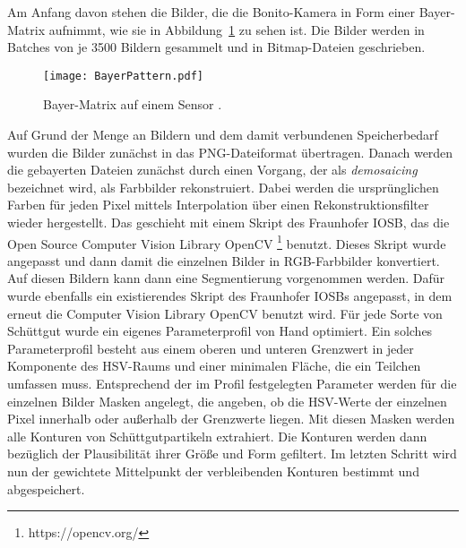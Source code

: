 Am Anfang davon stehen die Bilder, die die Bonito-Kamera in Form einer Bayer-Matrix aufnimmt, wie sie in Abbildung~\ref{fig:bayerPattern} zu sehen ist.
Die Bilder werden in Batches von je 3500 Bildern gesammelt und in Bitmap-Dateien geschrieben.
\begin{figure}[h]
	\centering
	\texttt{[image: BayerPattern.pdf]}
	\caption{Bayer-Matrix auf einem Sensor \cite{bayerPattern06}.}
	\label{fig:bayerPattern}
\end{figure}
Auf Grund der Menge an Bildern und dem damit verbundenen Speicherbedarf wurden die Bilder zunächst in das PNG-Dateiformat übertragen.
Danach werden die gebayerten Dateien zunächst durch einen Vorgang, der als \textit{demosaicing} bezeichnet wird,
als Farbbilder rekonstruiert.
Dabei werden die ursprünglichen Farben für jeden Pixel mittels Interpolation über einen Rekonstruktionsfilter wieder hergestellt.
Das geschieht mit einem Skript des Fraunhofer IOSB, das die Open Source Computer Vision Library OpenCV \footnote{https://opencv.org/} benutzt.
Dieses Skript wurde angepasst und dann damit die einzelnen Bilder in RGB-Farbbilder konvertiert.
Auf diesen Bildern kann dann eine Segmentierung vorgenommen werden.
Dafür wurde ebenfalls ein existierendes Skript des Fraunhofer IOSBs angepasst, in dem erneut die Computer Vision Library OpenCV benutzt wird.
Für jede Sorte von Schüttgut wurde ein eigenes Parameterprofil von Hand optimiert.
Ein solches Parameterprofil besteht aus einem oberen und unteren Grenzwert in jeder Komponente des HSV-Raums und einer minimalen Fläche, die ein Teilchen umfassen muss.
Entsprechend der im Profil festgelegten Parameter werden für die einzelnen Bilder Masken angelegt,
die angeben, ob die HSV-Werte der einzelnen Pixel innerhalb oder außerhalb der Grenzwerte liegen. 
Mit diesen Masken werden alle Konturen von Schüttgutpartikeln extrahiert. 
Die Konturen werden dann bezüglich der Plausibilität ihrer Größe und Form gefiltert. 
Im letzten Schritt wird nun der gewichtete Mittelpunkt der verbleibenden Konturen bestimmt und abgespeichert.


